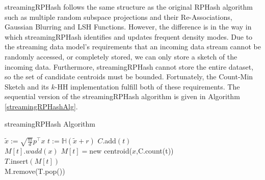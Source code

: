 \textsf{streamingRPHash} follows the same structure as the original \textsf{RPHash} algorithm such as multiple random subspace
projections and their Re-Associations, Gaussian Blurring and LSH Functions.  However, the difference is in the way in
which \textsf{streamingRPHash} identifies and updates frequent density modes.  Due to the streaming data model's requirements
that an incoming data stream cannot be randomly accessed, or completely stored, we can only store a sketch of the
incoming data.  Furthermore, \textsf{streamingRPHash} cannot store the entire dataset, so the set of candidate centroids must be
bounded.  Fortunately, the Count-Min Sketch and its $k$-HH implementation fulfill both of these requirements.
The sequential version of the \textsf{streamingRPHash} algorithm is given in Algorithm \ref{streamingRPHashAlg}.

\begin{algorithm}

\caption{\textsf{streamingRPHash} Algorithm\label{streamingRPHashAlg}}
\DontPrintSemicolon
{} 
{
  {
    $\tilde{x}:= \sqrt{\frac{m}{d}}p^{\intercal}x$ 
      {
      $t := \mathbb{H}(\tilde{x}+r)$ 
      $C$.add$(t)$\\
      {
	$M[t].wadd(x)$  
      }
      {
	 $M[t]=$new centroid($x$,C.count(t))\\
	 $T$.insert$(M[t])$\\
      }
      M.remove(T.pop())  
    }
  }
}
\end{algorithm}


